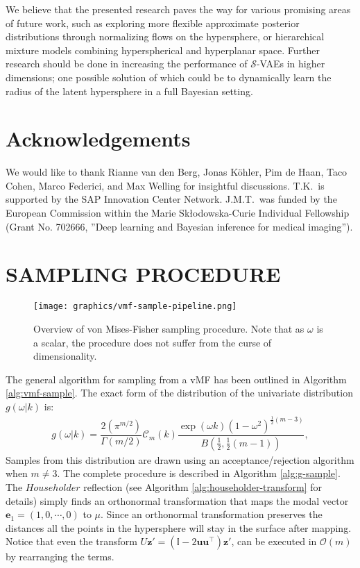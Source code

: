 \documentclass[letterpaper]{article}
\newcommand{\Sv}{$\mathcal{S}$}
\newcommand{\z}{\mathbf{z}}
\newcommand{\e}{\mathbf{e}}
\newcommand{\uv}{\mathbf{u}}
\begin{document}
We believe that the presented research paves the way for various promising areas of future work, such as exploring more flexible approximate posterior distributions through normalizing flows on the hypersphere, or hierarchical mixture models combining hyperspherical and hyperplanar space. Further research should be done in increasing the performance of \Sv-VAEs in higher dimensions; one possible solution of which could be to dynamically learn the radius of the latent hypersphere in a full Bayesian setting.

\section*{Acknowledgements}
We would like to thank Rianne van den Berg, Jonas K\"ohler, Pim de Haan, Taco Cohen, Marco Federici, and Max Welling for insightful discussions. T.K.~is supported by the SAP Innovation Center Network. J.M.T.~was funded by the European Commission within the Marie Sk\l odowska-Curie Individual Fellowship (Grant No. 702666, ”Deep learning and Bayesian inference for medical imaging”).


 



\onecolumn

\appendix
\section{SAMPLING PROCEDURE} \label{app:vmf-sample}

\begin{figure}[H]\label{fig:sampling}
  \centering
  \texttt{[image: graphics/vmf-sample-pipeline.png]}
  \caption{Overview of von Mises-Fisher sampling procedure. Note that as $\omega$ is a scalar, the procedure does not suffer from the curse of dimensionality.}
\end{figure}
 
The general algorithm for sampling from a vMF has been outlined in Algorithm \ref{alg:vmf-sample}. 
The exact form of the distribution of the univariate distribution $g(\omega| k)$ is:
\begin{align}
    g(\omega| k) = \dfrac{2(\pi^{m/2})}{\Gamma(m/2)} \mathcal{C}_m(k) \dfrac{\exp(\omega k)(1-\omega^2)^{\frac{1}{2}(m-3)}}{B(\frac{1}{2}, \frac{1}{2}(m-1))},
\end{align}
Samples from this distribution are drawn using an acceptance/rejection algorithm when $m \neq 3$. The complete procedure is described in Algorithm \ref{alg:g-sample}. The $Householder$ reflection (see Algorithm \ref{alg:householder-transform} for details) simply finds an orthonormal transformation that maps the modal vector $\e_1 = (1,0,\cdots,0)$ to $\mu$. Since an orthonormal transformation preserves the distances all the points in the hypersphere will stay in the surface after mapping. Notice that even the transform $U\z' =  (\mathbb{I} - 2\uv  \uv^{\top})\z'$, can be executed in $\mathcal{O}(m)$ by rearranging the terms. 
\end{document}
